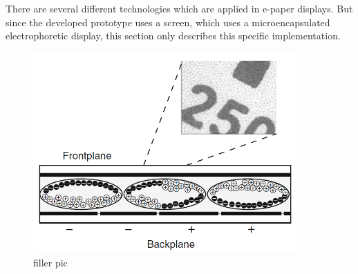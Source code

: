 There are several different technologies which are applied in e-paper displays.
But since the developed prototype uses a screen, which uses a microencapsulated electrophoretic display, this section only describes this specific implementation.


\begin{figure}[h]
	\centering
	\includegraphics[width=0.9\textwidth]{3-theory/e-paper-display/graphics/capsules.png}
	\caption{filler pic\label{theory:capsules}}
\end{figure}



\cite{amundson}
